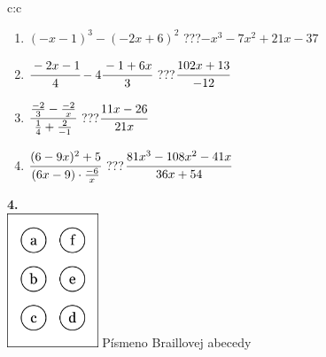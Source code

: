 \documentclass[10pt]{report}
\begin{document}
\begin{tabular}{c:c}
\begin{minipage}[c][104.5mm][t]{0.5\linewidth}
\begin{center}
\begin{minipage}{0.79\linewidth}
\begin{center}
\begin{varwidth}{\linewidth}
\begin{enumerate}
\item $(-x-1)^3-(-2x+6)^2$\quad \dotfill\; ???\;\dotfill \quad $-x^3-7x^2+21x-37$
\item $\cfrac{-2x-1}{4}-4\cfrac{-1+6x}{3}$\quad \dotfill\; ???\;\dotfill \quad $\cfrac{102x+13}{-12}$
\item $\cfrac{\frac{-2}{3}-\frac{-2}{x}}{\frac{1}{4}+\frac{2}{-1}}$\quad \dotfill\; ???\;\dotfill \quad $\cfrac{11x-26}{21x}$
\item $\cfrac{(6-9x)^2+5}{(6x-9)\cdot\frac{-6}{x}}$\quad \dotfill\; ???\;\dotfill \quad $\cfrac{81x^3-108x^2-41x}{36x+54}$
\end{enumerate}
\end{varwidth}
\end{center}
\end{minipage}
\begin{minipage}{0.20\linewidth}
\begin{center}
{\Huge\bfseries 4.} \\[2mm]
\includegraphics[height=40mm]{../images/braille.png}
{\small Písmeno Braillovej abecedy}
\end{center}
\end{minipage}
\end{center}
\end{minipage}
%
\end{tabular}
\newpage
\thispagestyle{empty}
\end{document}
